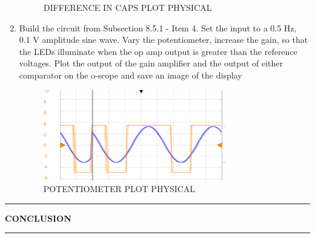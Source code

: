 \documentclass{article}
\begin{document}
\begin{enumerate}
\begin{figure}[H]
        \caption{DIFFERENCE IN CAPS PLOT PHYSICAL} 
        \label{fig:diff-plot-phys}
    \end{figure}
    \item Build the circuit from Subsection 8.5.1 - Item 4. Set the input to a 0.5 Hz, 0.1
V amplitude sine wave. Vary the potentiometer, increase the gain, so that the
LEDs illuminate when the op amp output is greater than the reference voltages.
Plot the output of the gain amplifier and the output of either comparator on
the o-scope and save an image of the display
    \begin{figure}[H]
        \centering
        \includegraphics[width=0.75\textwidth]{inlab_4.png}
        \caption{POTENTIOMETER PLOT PHYSICAL} 
        \label{fig:pot-plot-phys}
    \end{figure}


\end{enumerate}
\pagebreak
\begin{center}
    \hrule
    \vspace{0.2cm}
    \textbf{\large CONCLUSION}
    \vspace{0.2cm}
    \hrule
\end{center}
\end{document}
